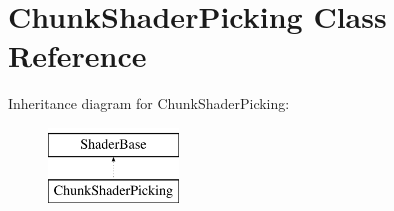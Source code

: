 \hypertarget{classChunkShaderPicking}{\section{\-Chunk\-Shader\-Picking \-Class \-Reference}
\label{classChunkShaderPicking}
}
\-Inheritance diagram for \-Chunk\-Shader\-Picking\-:\begin{figure}[H]
\begin{center}
\leavevmode
\includegraphics[height=2.000000cm]{classChunkShaderPicking}
\end{center}
\end{figure}
